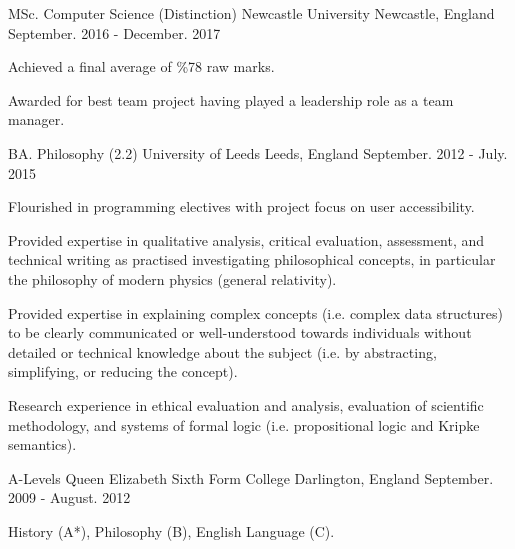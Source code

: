 

\begin{cventries}

  \cventry
    {MSc. Computer Science (Distinction)} %
    {Newcastle University} %
    {Newcastle, England} %
    {September. 2016 - December. 2017} %
    {
      \begin{cvitems} %
        \item {Achieved a final average of \%78 raw marks.}
        \item {Awarded for best team project having played a leadership role as a team manager.}
      \end{cvitems}
    }

  \cventry
    {BA. Philosophy (2.2)} %
    {University of Leeds} %
    {Leeds, England} %
    {September. 2012 - July. 2015} %
    {
      \begin{cvitems} %
        \item {Flourished in programming electives with project focus on user accessibility.}
        \item {Provided expertise in qualitative analysis, critical evaluation, assessment, and technical writing as practised investigating philosophical concepts, in particular the philosophy of modern physics (general relativity).}
        \item {Provided expertise in explaining complex concepts (i.e. complex data structures) to be clearly communicated or well-understood towards individuals without detailed or technical knowledge about the subject (i.e. by abstracting, simplifying, or reducing the concept).}
        \item {Research experience in ethical evaluation and analysis, evaluation of scientific methodology, and systems of formal logic (i.e. propositional logic and Kripke semantics).}
      \end{cvitems}
    }

  \cventry
    {A-Levels} %
    {Queen Elizabeth Sixth Form College} %
    {Darlington, England} %
    {September. 2009 - August. 2012} %
    {
      \begin{cvitems} %
        \item {History (A*), Philosophy (B), English Language (C).}
      \end{cvitems}
    }


\end{cventries}
